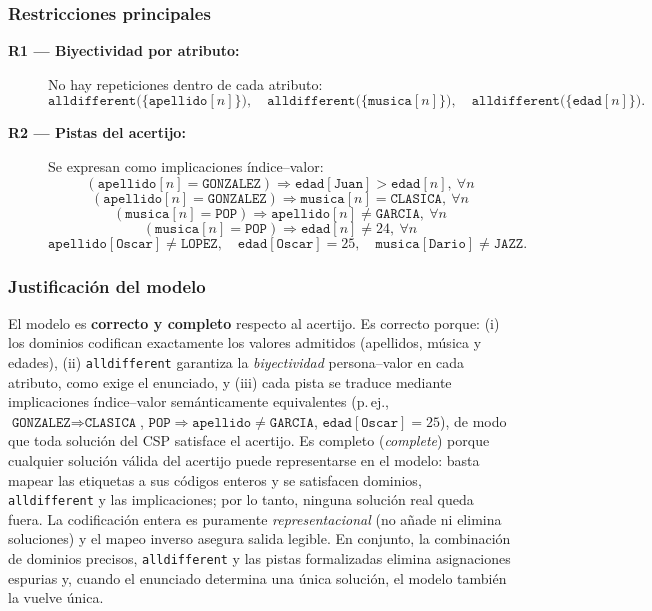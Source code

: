 \subsubsection*{Restricciones principales}
\begin{description}
  \item[\textbf{R1 — Biyectividad por atributo:}] No hay repeticiones dentro de cada atributo:
  \[
  \texttt{alldifferent}\big(\{\texttt{apellido}[n]\}\big),\quad
  \texttt{alldifferent}\big(\{\texttt{musica}[n]\}\big),\quad
  \texttt{alldifferent}\big(\{\texttt{edad}[n]\}\big).
  \]
  \item[\textbf{R2 — Pistas del acertijo:}] Se expresan como implicaciones índice–valor:
  \[
  (\texttt{apellido}[n]=\texttt{GONZALEZ})\Rightarrow \texttt{edad}[\texttt{Juan}]>\texttt{edad}[n],\ \forall n
  \]
  \[
  (\texttt{apellido}[n]=\texttt{GONZALEZ})\Rightarrow \texttt{musica}[n]=\texttt{CLASICA},\ \forall n
  \]
  \[
  (\texttt{musica}[n]=\texttt{POP})\Rightarrow \texttt{apellido}[n]\neq \texttt{GARCIA},\ \forall n
  \]
  \[
  (\texttt{musica}[n]=\texttt{POP})\Rightarrow \texttt{edad}[n]\neq 24,\ \forall n
  \]
  \[
  \texttt{apellido}[\texttt{Oscar}]\neq \texttt{LOPEZ},\quad
  \texttt{edad}[\texttt{Oscar}]=25,\quad
  \texttt{musica}[\texttt{Dario}]\neq \texttt{JAZZ}.
  \]
\end{description}

\subsubsection*{Justificación del modelo}
El modelo es \textbf{correcto y completo} respecto al acertijo. Es correcto porque: (i) los dominios codifican exactamente los valores admitidos (apellidos, música y edades), (ii) \texttt{alldifferent} garantiza la \emph{biyectividad} persona–valor en cada atributo, como exige el enunciado, y (iii) cada pista se traduce mediante implicaciones índice–valor semánticamente equivalentes (p.\,ej., \(\texttt{GONZALEZ}\Rightarrow\texttt{CLASICA}\), \(\texttt{POP}\Rightarrow\texttt{apellido}\neq\texttt{GARCIA}\), \(\texttt{edad}[\texttt{Oscar}]=25\)), de modo que toda solución del CSP satisface el acertijo. Es completo (\emph{complete}) porque cualquier solución válida del acertijo puede representarse en el modelo: basta mapear las etiquetas a sus códigos enteros y se satisfacen dominios, \texttt{alldifferent} y las implicaciones; por lo tanto, ninguna solución real queda fuera. La codificación entera es puramente \emph{representacional} (no añade ni elimina soluciones) y el mapeo inverso asegura salida legible. En conjunto, la combinación de dominios precisos, \texttt{alldifferent} y las pistas formalizadas elimina asignaciones espurias y, cuando el enunciado determina una única solución, el modelo también la vuelve única.


